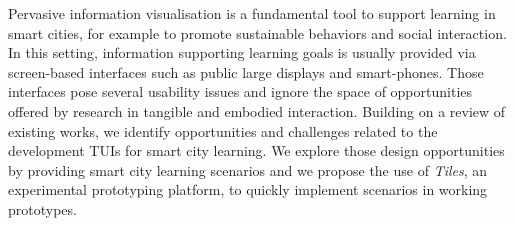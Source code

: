 Pervasive information visualisation is a fundamental tool to support learning in smart cities, for example to promote sustainable behaviors and social interaction. In this setting, information supporting learning goals is usually provided via screen-based interfaces such as public large displays and smart-phones. Those interfaces pose several usability issues and ignore the space of opportunities offered by research in tangible and embodied interaction. Building on a review of existing works, we identify opportunities and challenges related to the development TUIs for smart city learning. We explore those design opportunities by providing smart city learning scenarios and we propose the use of \emph{Tiles}, an experimental prototyping platform, to quickly implement scenarios in working prototypes.  

